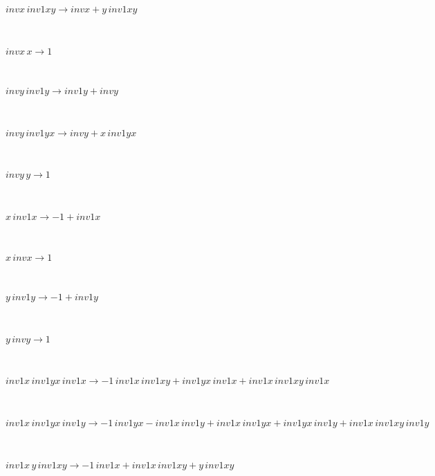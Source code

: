 \begin{minipage}{6in}
$
invx\,
 inv1xy\rightarrow invx + y\,
 inv1xy
$
\end{minipage}\medskip \\
\begin{minipage}{6in}
$
invx\,
 x\rightarrow 1
$
\end{minipage}\medskip \\
\begin{minipage}{6in}
$
invy\,
 inv1y\rightarrow inv1y + invy
$
\end{minipage}\medskip \\
\begin{minipage}{6in}
$
invy\,
 inv1yx\rightarrow invy + x\,
 inv1yx
$
\end{minipage}\medskip \\
\begin{minipage}{6in}
$
invy\,
 y\rightarrow 1
$
\end{minipage}\medskip \\
\begin{minipage}{6in}
$
x\,
 inv1x\rightarrow -1 + inv1x
$
\end{minipage}\medskip \\
\begin{minipage}{6in}
$
x\,
 invx\rightarrow 1
$
\end{minipage}\medskip \\
\begin{minipage}{6in}
$
y\,
 inv1y\rightarrow -1 + inv1y
$
\end{minipage}\medskip \\
\begin{minipage}{6in}
$
y\,
 invy\rightarrow 1
$
\end{minipage}\medskip \\
\begin{minipage}{6in}
$
inv1x\,
 inv1yx\,
 inv1x\rightarrow -1\,
 inv1x\,
 inv1xy + inv1yx\,
 inv1x + inv1x\,
 inv1xy\,
 inv1x
$
\end{minipage}\medskip \\
\begin{minipage}{6in}
$
inv1x\,
 inv1yx\,
 inv1y\rightarrow -1\,
 inv1yx - inv1x\,
 inv1y + inv1x\,
 inv1yx + inv1yx\,
 inv1y + inv1x\,
 inv1xy\,
 inv1y
$
\end{minipage}\medskip \\
\begin{minipage}{6in}
$
inv1x\,
 y\,
 inv1xy\rightarrow -1\,
 inv1x + inv1x\,
 inv1xy + y\,
 inv1xy
$
\end{minipage}\medskip \\
